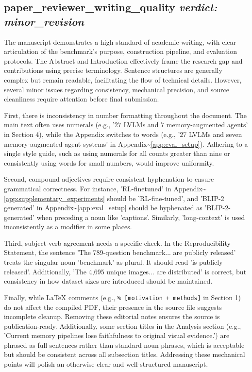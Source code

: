 \documentclass{llmxive}
\begin{document}
\bigskip

\subsection*{paper\_reviewer\_writing\_quality \hfill \textit{verdict: minor\_revision}}
The manuscript demonstrates a high standard of academic writing, with clear articulation of the benchmark's purpose, construction pipeline, and evaluation protocols. The Abstract and Introduction effectively frame the research gap and contributions using precise terminology. Sentence structures are generally complex but remain readable, facilitating the flow of technical details. However, several minor issues regarding consistency, mechanical precision, and source cleanliness require attention before final submission.

First, there is inconsistency in number formatting throughout the document. The main text often uses numerals (e.g., '27 LVLMs and 7 memory-augmented agents' in Section 4), while the Appendix switches to words (e.g., '27 LVLMs and seven memory-augmented agent systems' in Appendix\textasciitilde{}\ref{app:eval_setup}). Adhering to a single style guide, such as using numerals for all counts greater than nine or consistently using words for small numbers, would improve uniformity.

Second, compound adjectives require consistent hyphenation to ensure grammatical correctness. For instance, 'RL-finetuned' in Appendix\textasciitilde{}\ref{app:supplementary_experiments} should be 'RL-fine-tuned', and 'BLIP-2 generated' in Appendix\textasciitilde{}\ref{app:eval_setup} should be hyphenated as 'BLIP-2-generated' when preceding a noun like 'captions'. Similarly, 'long-context' is used inconsistently as a modifier in some places.

Third, subject-verb agreement needs a specific check. In the Reproducibility Statement, the sentence 'The 789-question benchmark... are publicly released' treats the singular noun 'benchmark' as plural. It should read 'is publicly released'. Additionally, 'The 4,695 unique images... are distributed' is correct, but consistency in how dataset sizes are introduced should be maintained.

Finally, while LaTeX comments (e.g., \texttt{\% [motivation + methods]} in Section 1) do not affect the compiled PDF, their presence in the source file suggests incomplete cleanup. Removing these editorial notes ensures the source is publication-ready. Additionally, some section titles in the Analysis section (e.g., 'Current memory pipelines lose faithfulness to original visual evidence.') are phrased as full sentences rather than standard noun phrases, which is acceptable but should be consistent across all subsection titles. Addressing these mechanical points will polish an otherwise clear and well-structured manuscript.
\end{document}
